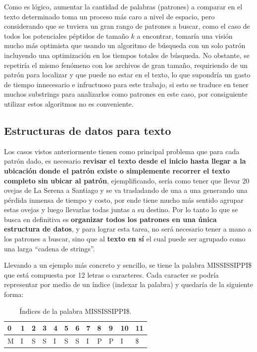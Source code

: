 Como es lógico, aumentar la cantidad de palabras (patrones) a comparar en el texto determinado toma un proceso más caro a nivel de espacio, pero considerando que se tuviera un gran rango de patrones a buscar, como el caso de todos los potenciales péptidos de tamaño $k$ a encontrar, tomaría una visión mucho más optimista que usando un algoritmo de búsqueda con un solo patrón incluyendo una optimización en los tiempos totales de búsqueda. No obstante, se repetiría el mismo fenómeno con los archivos de gran tamaño, requiriendo de un patrón para localizar y que puede no estar en el texto, lo que supondría un gasto de tiempo innecesario e infructuoso para este trabajo, si esto se traduce en tener muchos substrings para analizarlos como patrones en este caso, por consiguiente utilizar estos algoritmos no es conveniente.



\subsection{Estructuras de datos para texto}

Los casos vistos anteriormente tienen como principal problema que para cada patrón dado, es necesario \textbf{revisar el texto desde el inicio hasta llegar a la ubicación donde el patrón existe o simplemente recorrer el texto completo sin ubicar al patrón}, ejemplificando, sería como tener que llevar 20 ovejas de La Serena a Santiago y se va trasladando de una a una generando una pérdida inmensa de tiempo y costo, por ende tiene mucho más sentido agrupar estas ovejas y luego llevarlas todas juntas a su destino. Por lo tanto lo que se busca en definitiva es \textbf{organizar todos los patrones en una única estructura de datos}, y para lograr esta tarea, no será necesario tener a mano a los patrones a buscar, sino que al \textbf{texto en sí} el cual puede ser agrupado como una larga ``cadena de strings''.

Llevando a un ejemplo más concreto y sencillo, se tiene la palabra MISSISSIPPI\$ que está compuesta por 12 letras o caracteres. Cada caracter se podría representar por medio de un índice (indexar la palabra) y quedaría de la siguiente forma:

\begin{table}[h]
\centering
\begin{tabular}{llllllllllll}
0                       & 1                      & 2                      & 3                      & 4                      & 5                      & 6                      & 7                      & 8                      & 9                      & 10                     & 11                     \\ \hline
\multicolumn{1}{|l|}{M} & \multicolumn{1}{l|}{I} & \multicolumn{1}{l|}{S} & \multicolumn{1}{l|}{S} & \multicolumn{1}{l|}{I} & \multicolumn{1}{l|}{S} & \multicolumn{1}{l|}{S} & \multicolumn{1}{l|}{I} & \multicolumn{1}{l|}{P} & \multicolumn{1}{l|}{P} & \multicolumn{1}{l|}{I} & \multicolumn{1}{l|}{\$} \\ \hline
\end{tabular}
\caption{Índices de la palabra MISSISSIPPI\$.}
\end{table}

